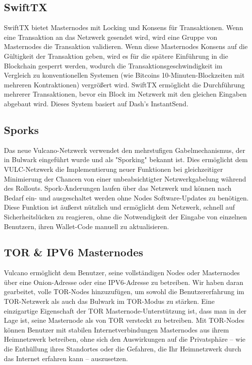 \documentclass[A4paper, 12pt]{article}
\begin{document}
\subsection{SwiftTX}
SwiftTX bietet Masternodes mit Locking und Konsens für Transaktionen. Wenn eine Transaktion an das Netzwerk gesendet wird, wird eine Gruppe von Masternodes die Transaktion validieren. Wenn diese Masternodes Konsens auf die Gültigkeit der Transaktion geben, wird es für die spätere Einführung in die Blockchain gesperrt werden, wodurch die Transaktionsgeschwindigkeit im Vergleich zu konventionellen Systemen (wie Bitcoins 10-Minuten-Blockzeiten mit mehreren Kontraktionen) vergrößert wird. SwiftTX ermöglicht die Durchführung mehrerer Transaktionen, bevor ein Block im Netzwerk mit den gleichen Eingaben abgebaut wird. Dieses System basiert auf Dash's InstantSend. 

\subsection{Sporks}
Das neue Vulcano-Netzwerk verwendet den mehrstufigen Gabelmechanismus, der in Bulwark eingeführt wurde und als "Sporking" bekannt ist. Dies ermöglicht dem VULC-Netzwerk die Implementierung neuer Funktionen bei gleichzeitiger Minimierung der Chancen von einer unbeabsichtigter Netzwerkgabelung während des Rollouts. Spork-Änderungen laufen über das Netzwerk und können nach Bedarf ein- und ausgeschaltet werden ohne Nodes Software-Updates zu benötigen. Diese Funktion ist äußerst nützlich und ermöglicht dem Netzwerk, schnell auf Sicherheitslücken zu reagieren, ohne die Notwendigkeit der Eingabe von einzelnen Benutzern, ihren Wallet-Code manuell zu aktualisieren. 

\subsection{TOR \& IPV6 Masternodes}
Vulcano ermöglicht dem Benutzer, seine vollständigen Nodes oder Masternodes über eine Onion-Adresse oder eine IPV6-Adresse zu betreiben. Wir haben daran gearbeitet, volle TOR-Nodes hinzuzufügen, um sowohl die Benutzererfahrung im TOR-Netzwerk als auch das Bulwark im TOR-Modus zu stärken. Eine einzigartige Eigenschaft der TOR Masternode-Unterstützung ist, dass man in der Lage ist, seine Masternode als von TOR versteckt zu betreiben. Mit TOR-Nodes können Benutzer mit stabilen Internetverbindungen Masternodes aus ihrem Heimnetzwerk betreiben, ohne sich den Auswirkungen auf die Privatsphäre – wie die Enthüllung ihres Standortes oder die Gefahren, die Ihr Heimnetzwerk durch das Internet erfahren kann – auszusetzen. 
 
\end{document}
